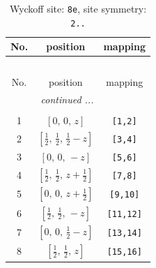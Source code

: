 \documentclass[fleqn,8pt]{jsarticle}
\begin{document}
\renewcommand{\arraystretch}{1.2}
\begin{longtable}{ccc}
\caption{Wyckoff site: {\tt 8e}, site symmetry: {\tt 2..}}
 \\
 \hline \hline
No. & position & mapping \\ \hline \endfirsthead

\multicolumn{2}{l}{\tablename\ \thetable{}} \\
 \hline \hline
No. & position & mapping \\ \hline \endhead

 \hline \hline
\multicolumn{2}{r}{\footnotesize\it continued ...} \\ \endfoot

 \hline \hline
\multicolumn{2}{r}{} \\ \endlastfoot

1 & $\left[ 0,\, 0,\, z \right]$ & {\tt [1,2]} \\ \hline
2 & $\left[ \frac{1}{2},\, \frac{1}{2},\, \frac{1}{2} - z \right]$ & {\tt [3,4]} \\ \hline
3 & $\left[ 0,\, 0,\, - z \right]$ & {\tt [5,6]} \\ \hline
4 & $\left[ \frac{1}{2},\, \frac{1}{2},\, z + \frac{1}{2} \right]$ & {\tt [7,8]} \\ \hline
5 & $\left[ 0,\, 0,\, z + \frac{1}{2} \right]$ & {\tt [9,10]} \\ \hline
6 & $\left[ \frac{1}{2},\, \frac{1}{2},\, - z \right]$ & {\tt [11,12]} \\ \hline
7 & $\left[ 0,\, 0,\, \frac{1}{2} - z \right]$ & {\tt [13,14]} \\ \hline
8 & $\left[ \frac{1}{2},\, \frac{1}{2},\, z \right]$ & {\tt [15,16]} \\
\end{longtable}
\renewcommand{\arraystretch}{1.2}
\end{document}
